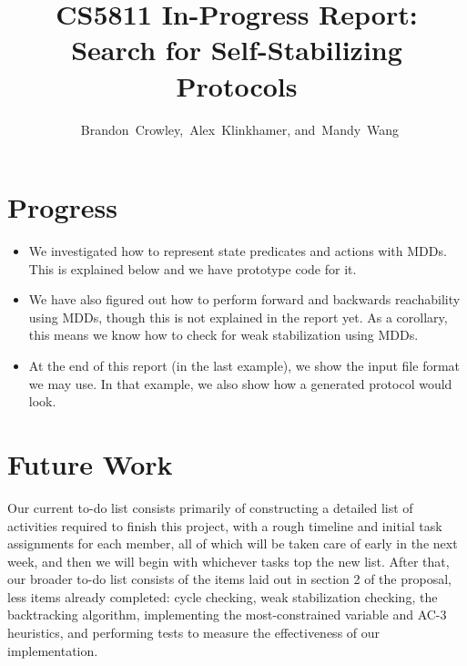 


\usepackage{tikz}
\usetikzlibrary{arrows}
\usepackage{listings}



\title{
 CS5811 In-Progress Report:\\
 Search for Self-Stabilizing Protocols
}

\author{~Brandon~Crowley,~Alex~Klinkhamer, and~Mandy~Wang}
\maketitle




\section{Progress}

\begin{itemize}
 \item We investigated how to represent state predicates and actions with MDDs.
  This is explained below and we have prototype code for it.
 \item We have also figured out how to perform forward and backwards reachability using MDDs, though this is not explained in the report yet.
  As a corollary, this means we know how to check for weak stabilization using MDDs.
 \item At the end of this report (in the last example), we show the input file format we may use.
  In that example, we also show how a generated protocol would look.
\end{itemize}

\section{Future Work}

Our current to-do list consists primarily of constructing a detailed list of activities required to finish this project, with a rough timeline 
and initial task assignments for each member, all of which will be taken care of early in the next week, and then we will begin with whichever tasks top
the new list.  After that, our broader to-do list consists of the items laid out in section 2 of the proposal, less items already completed:
cycle checking, weak stabilization checking, the backtracking algorithm, implementing the most-constrained variable and AC-3 heuristics, and performing
tests to measure the effectiveness of our implementation.

